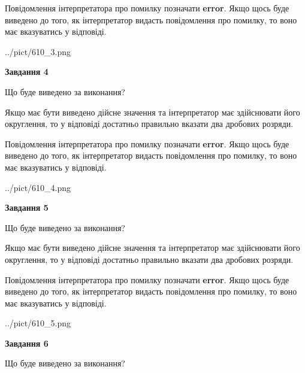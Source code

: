 \documentclass[12pt, ukrainian]{article}
\begin{document}
{\begin {Large}
Повідомлення інтерпретатора про помилку позначати \textbf{error}.
Якщо щось буде виведено до того, як інтерпретатор видасть повідомлення про помилку, 
то воно має вказуватись у відповіді. \par

\begin{center}
	{../pict/610_3.png}
\end{center}
\newpage

{\begin {center}\textbf{Завдання 4}\end {center}}\par
Що буде виведено за виконання? \par

Якщо має бути виведено дійсне значення та інтерпретатор має здійснювати його округлення, 
то у відповіді достатньо правильно вказати два дробових розряди.

Повідомлення інтерпретатора про помилку позначати \textbf{error}.
Якщо щось буде виведено до того, як інтерпретатор видасть повідомлення про помилку, 
то воно має вказуватись у відповіді. \par

\begin{center}
	{../pict/610_4.png}
\end{center}
\newpage

{\begin {center}\textbf{Завдання 5}\end {center}}\par
Що буде виведено за виконання? \par

Якщо має бути виведено дійсне значення та інтерпретатор має здійснювати його округлення, 
то у відповіді достатньо правильно вказати два дробових розряди.

Повідомлення інтерпретатора про помилку позначати \textbf{error}.
Якщо щось буде виведено до того, як інтерпретатор видасть повідомлення про помилку, 
то воно має вказуватись у відповіді. \par

\begin{center}
	{../pict/610_5.png}
\end{center}
\newpage

{\begin {center}\textbf{Завдання 6}\end {center}}\par
Що буде виведено за виконання? \par


\end{Large}}
\end{document}
